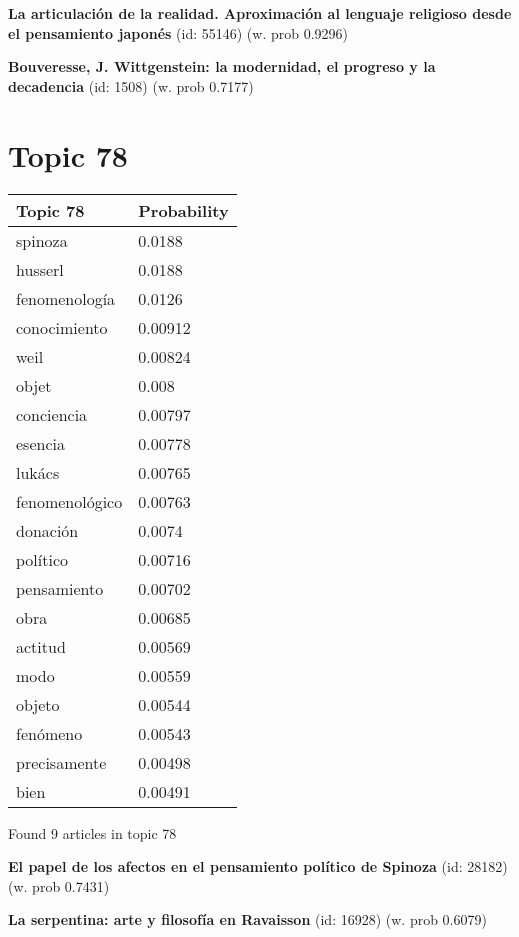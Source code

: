 \documentclass{article}
\begin{document}
\textbf{La articulación de la realidad. Aproximación al lenguaje religioso desde el pensamiento japonés} (id: 55146)
 (w. prob 0.9296)
\vfill

\textbf{Bouveresse, J. Wittgenstein: la modernidad, el progreso y la decadencia} (id: 1508)
 (w. prob 0.7177)

\vfill
\newpage


\centering
\thispagestyle{empty}
\section*{Topic 78}\vfill
\begin{tabular}{ll}
\toprule
       Topic 78 & Probability \\
\midrule
        spinoza &      0.0188 \\
        husserl &      0.0188 \\
  fenomenología &      0.0126 \\
   conocimiento &     0.00912 \\
           weil &     0.00824 \\
          objet &       0.008 \\
     conciencia &     0.00797 \\
        esencia &     0.00778 \\
         lukács &     0.00765 \\
 fenomenológico &     0.00763 \\
       donación &      0.0074 \\
       político &     0.00716 \\
    pensamiento &     0.00702 \\
           obra &     0.00685 \\
        actitud &     0.00569 \\
           modo &     0.00559 \\
         objeto &     0.00544 \\
       fenómeno &     0.00543 \\
   precisamente &     0.00498 \\
           bien &     0.00491 \\
\bottomrule
\end{tabular}

\vfill
Found 9 articles in topic 78
\vfill

\textbf{El papel de los afectos en el pensamiento político de Spinoza} (id: 28182)
 (w. prob 0.7431)
\vfill

\textbf{La serpentina: arte y filosofía en Ravaisson} (id: 16928)
 (w. prob 0.6079)
\end{document}
